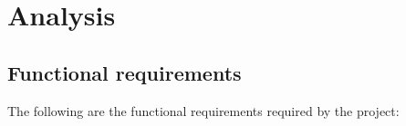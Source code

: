 \documentclass[a4paper, oneside]{memoir}
\begin{document}
\chapter{Analysis}\label{ch:analysis}


\section{Functional requirements}


The following are the functional requirements required by the project:
\end{document}
